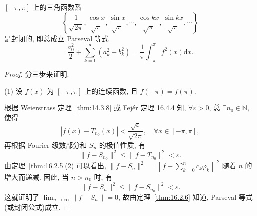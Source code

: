 \begin{theorem}\label{thm:16.2.7}
$[-\pi,\pi]$ 上的三角函数系
\[
  \left\{\frac{1}{\sqrt{2\pi}},\frac{\cos x}{\sqrt{\pi}},\frac{\sin x}{\sqrt{\pi}},\cdots,\frac{\cos kx}{\sqrt{\pi}},\frac{\sin kx}{\sqrt{\pi}},\cdots\right\}
\]
是封闭的, 即总成立 Parseval 等式
\[
  \frac{a_{0}^{2}}{2}+\sum_{k=1}^{\infty}(a_{k}^{2}+b_{k}^{2})=\frac{1}{\pi}\int_{-\pi}^{\pi}f^{2}(x)\mathrm{d}x.
\]
\end{theorem}

\begin{proof}
分三步来证明.

(1) 设 $f(x)$ 为 $[-\pi, \pi]$ 上的连续函数, 且 $f(-\pi) = f(\pi)$.

根据 Weierstrass 定理~\ref{thm:14.3.8} 或 Fej\'er 定理 16.4.4 知, $\forall\varepsilon>0$, 总 $\exists n_{0}\in\mathbb{N}$, 使得
\[
  |f(x)-T_{n_{0}}(x)|<\frac{\sqrt{\varepsilon}}{\sqrt{2\pi}},\quad\forall x\in[-\pi,\pi],
\]
再根据 Fourier 级数部分和 $S_{n}$ 的极值性质, 有
\[
  \|f-S_{n_{0}}\|^{2}\leqslant\|f-T_{n_{0}}\|^{2}<\varepsilon.
\]
由定理~\ref{thm:16.2.5}(2) 可以看出, $\| f - S_n \|^2 = \left\| f - \sum_{k=0}^{n} c_k \varphi_k \right\|^2$ 随着 $n$ 的增大而递减. 因此, 当 $n > n_0$ 时, 有
\[
  \|f-S_{n}\|^{2}\leqslant\|f-S_{n_{0}}\|^{2}<\varepsilon.
\]
这就证明了 $\lim_{n\to\infty}\|f-S_{n}\|=0$, 故由定理~\ref{thm:16.2.6} 知道, Parseval 等式(或封闭公式)成立.


\end{proof}
